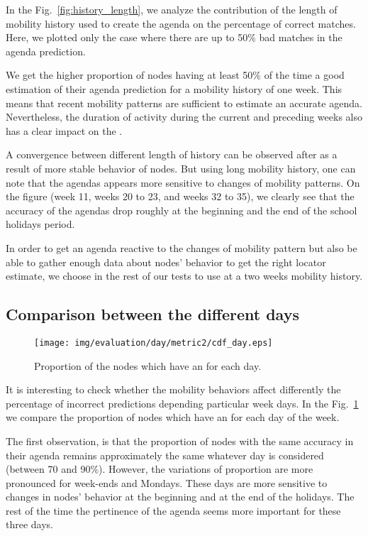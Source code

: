 \documentclass[a4paper]{sig-alternate-10pt}
\begin{document}
In the Fig.~\ref{fig:history_length}, we analyze the contribution of
the length of mobility history used to create the agenda on the
percentage of correct matches. Here, we plotted only the case where
there are up to 50\% bad matches in the agenda prediction.

We get the higher proportion of nodes having at least 50\% of the
time a good estimation of their agenda prediction  for a mobility
history of one week. This means that recent mobility patterns are
sufficient to estimate an accurate agenda. Nevertheless, the
duration  of activity during the current and preceding weeks also
has a clear impact on the .

A convergence between different length of history can be observed
after as a result of more stable behavior of nodes. But using long
mobility history, one can note that the agendas appears more
sensitive to changes of mobility patterns. On the figure (week 11,
weeks 20 to 23, and weeks 32 to 35), we clearly see that the
accuracy  of the agendas drop roughly at the beginning and the end
of the  school holidays period.

In order to get an agenda reactive to the changes of mobility
pattern  but also be able to gather enough data about nodes'
behavior to get  the right locator estimate, we choose in the rest
of our tests to use  at a two weeks mobility history.

\subsection{Comparison between the different days}
\begin{figure}
\texttt{[image: img/evaluation/day/metric2/cdf\_day.eps]}
\caption{Proportion of the nodes which have an  for
each day.} \label{fig:compare_days}
\end{figure}

It is interesting to check whether  the mobility behaviors affect
differently the percentage of incorrect predictions depending
particular week days. In the Fig.~\ref{fig:compare_days} we compare
the proportion of nodes which have an  for
each day of the week.

The first observation, is that the proportion of nodes with
the  same accuracy in their agenda remains approximately the same
whatever day is considered (between 70  and 90\%). However, the
variations of proportion are more pronounced  for week-ends and
Mondays. These days are more sensitive to changes in nodes' behavior
at the beginning and at the  end of the holidays. The rest of the
time the pertinence of the agenda seems more  important for these
three days.
\end{document}
